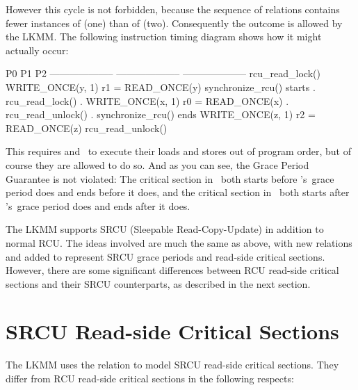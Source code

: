 However this cycle is not forbidden, because the sequence of
relations contains fewer instances of  (one) than of
 (two).
Consequently the outcome is allowed by the LKMM\@.
The following instruction timing diagram shows how it might actually
occur:

\begin{VerbatimU}
P0                      P1                      P2
--------------------    --------------------    --------------------
rcu_read_lock()
WRITE_ONCE(y, 1)
                        r1 = READ_ONCE(y)
                        synchronize_rcu() starts
                        .                       rcu_read_lock()
                        .                       WRITE_ONCE(x, 1)
r0 = READ_ONCE(x)       .
rcu_read_unlock()       .
                        synchronize_rcu() ends
                        WRITE_ONCE(z, 1)
                                                r2 = READ_ONCE(z)
                                                rcu_read_unlock()
\end{VerbatimU}

This requires  and~ to execute their loads and stores out of
program order, but of course they are allowed to do so.
And as you can see, the Grace Period Guarantee is not violated:
The critical section in~ both starts before 's~grace
period does and ends before it does, and the critical section in~
both starts after 's~grace period does and ends after it does.

The LKMM supports SRCU (Sleepable Read-Copy-Update) in addition to
normal RCU\@.
The ideas involved are much the same as above, with new
relations  and  added to represent SRCU
grace periods and read-side critical sections.
However, there are some significant differences between RCU read-side
critical sections and their SRCU counterparts, as described in the
next section.


\section{SRCU Read-side Critical Sections}
\label{sec:docs:explanation:SRCU Read-side Critical Sections}

The LKMM uses the  relation to model SRCU read-side critical
sections.
They differ from RCU read-side critical sections in the following respects:

